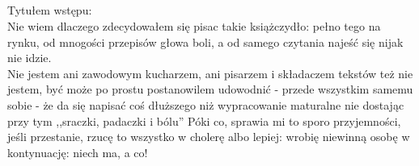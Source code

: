 \documentclass[./KNIGA.tex]{subfiles}
\begin{document}
\subparagraph{}Tytułem wstępu:\\
Nie wiem dlaczego zdecydowałem się pisac takie książczydło: pełno tego na rynku, od mnogości przepisów głowa boli, a od samego czytania najeść się nijak nie idzie.\\
Nie jestem ani zawodowym kucharzem, ani pisarzem i składaczem tekstów też nie jestem, być może po prostu postanowilem udowodnić - przede wszystkim samemu sobie - że da się napisać coś dłuższego niż wypracowanie maturalne nie dostając przy tym ,,sraczki, padaczki i bólu''
Póki co, sprawia mi to sporo przyjemności, jeśli przestanie, rzucę to wszystko w cholerę albo lepiej: wrobię niewinną osobę w kontynuację: niech ma, a co!
\end{document}
